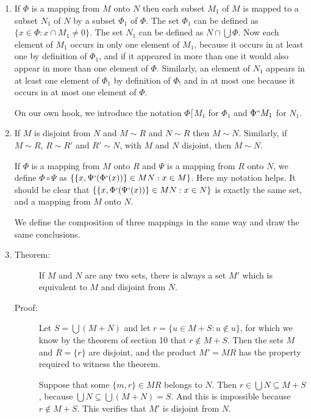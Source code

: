 \documentclass[12pt]{article}
\begin{document}
\begin{enumerate}
\item If $\Phi$ is a mapping from $M$ onto $N$ then each subset $M_1$ of $M$ is mapped to a subset $N_1$ of $N$ by a subset $\Phi_1$ of $\Phi$.  The set $\Phi_1$ can be defined
as $\{x \in \Phi: x \cap M_1 \neq 0\}$.   The set $N_1$ can be defined as $N \cap \bigcup \Phi$.  Now each element of $M_1$ occurs in only one element of $M_1$, because it occurs in at least one by definition of $\Phi_1$, and if it appeared in more than one it would also appear in more than one element of $\Phi$.  Similarly, an element of $N_1$ appears in at least one element of $\Phi_1$ by definition of $\Phi_!$ and in at most one because it occurs in at most one element of $\Phi$.

On our own hook, we introduce the notation $\Phi\lceil M_1$ for $\Phi_1$ and $\Phi``M_1$ for $N_1$.

\item If $M$ is disjoint from $N$ and $M \sim R$ and $N \sim R$ then $M \sim N$.   Similarly, if $M \sim R$, $R \sim R'$ and $R' \sim N$, with $M$ and $N$ disjoint, then
$M \sim N$.

If $\Phi$ is a mapping from $M$ onto $R$ and $\Psi$ is a mapping from $R$ onto $N$, we define $\Phi \circ \Psi$ as $\{\{x,\Psi`(\Phi`(x))\} \in MN:x \in M\}$.  Here my notation helps.
It should be clear that $\{\{x,\Phi`(\Psi`(x))\} \in MN:x \in N\}$ is exactly the same set, and a mapping from $M$ onto $N$. 

We define the composition of three mappings in the same way and draw the same conclusions.

\item  \begin{description}

\item[Theorem:]  If $M$ and $N$ are any two sets, there is always a set $M'$ which is equivalent to $M$ and disjoint from $N$.

\item[Proof:]  Let $S = \bigcup(M+N)$ and let $r = \{u \in M+S:u \not\in u\}$, for which we know by the theorem of section 10 that $r \not\in M+S$.  Then the sets $M$ and
$R = \{r\}$ are disjoint, and the product $M' = MR$ has the property required to witness the theorem.

Suppose that some $\{m,r\} \in MR$ belongs to $N$.  Then $r \in \bigcup N \subseteq M+S$, because $\bigcup N \subseteq \bigcup (M+N)=S$.  And this is impossible
because $r \not\in M+S$.  This verifies that $M'$ is disjoint from $N$.


\end{description}
\end{enumerate}
\end{document}
